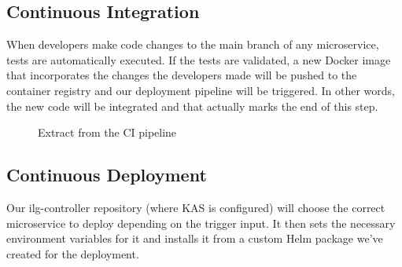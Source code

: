 \subsection{Continuous Integration}
When developers make code changes to the main branch of any microservice, tests are automatically executed.
If the tests are validated, a new Docker image that incorporates the changes the developers made will be pushed to the container registry and our deployment pipeline will be triggered.
In other words, the new code will be integrated and that actually marks the end of this step.
\begin{figure}[H]
    \centering
    \caption{Extract from the CI pipeline}
    \label{fig:extract-from-ci-pipeline}
\end{figure}

\subsection{Continuous Deployment}
Our ilg-controller repository (where KAS is configured) will choose the correct microservice to deploy depending on the trigger input.
It then sets the necessary environment variables for it and installs it from a custom Helm package we've created for the deployment.

